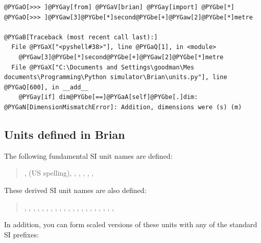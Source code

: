 \documentclass[letterpaper,10pt]{manual}
\begin{document}
\begin{Verbatim}[commandchars=@\[\]]
@PYGaO[>>> ]@PYGay[from] @PYGaV[brian] @PYGay[import] @PYGbe[*]
@PYGaO[>>> ]@PYGaw[3]@PYGbe[*]second@PYGbe[+]@PYGaw[2]@PYGbe[*]metre

@PYGaB[Traceback (most recent call last):]
  File @PYGaX["<pyshell#38>"], line @PYGaQ[1], in <module>
    @PYGaw[3]@PYGbe[*]second@PYGbe[+]@PYGaw[2]@PYGbe[*]metre
  File @PYGaX["C:\Documents and Settings\goodman\Mes documents\Programming\Python simulator\Brian\units.py"], line @PYGaQ[600], in __add__
    @PYGay[if] dim@PYGbe[==]@PYGaA[self]@PYGbe[.]dim:
@PYGaN[DimensionMismatchError]: Addition, dimensions were (s) (m)
\end{Verbatim}


\subsection{Units defined in Brian}

The following fundamental SI unit names are defined:
\begin{quote}

,  (US spelling), , , , , , 
\end{quote}

These derived SI unit names are also defined:
\begin{quote}

, , , , , , ,
, , , , , , ,
, , , , , , , 
\end{quote}

In addition, you can form scaled versions of these units with any of the standard SI prefixes:
\end{document}
